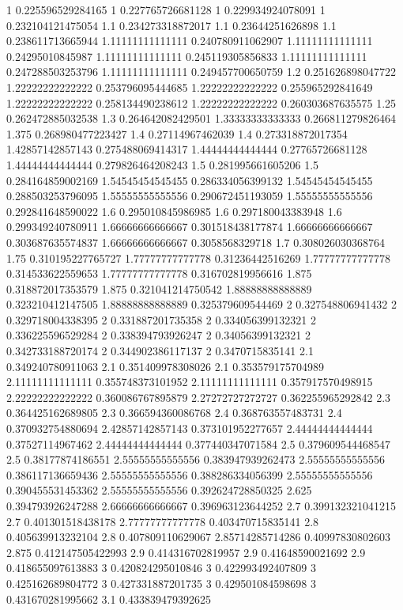 {1 0.225596529284165
1 0.227765726681128
1 0.229934924078091
1 0.232104121475054
1.1 0.234273318872017
1.1 0.23644251626898
1.1 0.238611713665944
1.11111111111111 0.240780911062907
1.11111111111111 0.24295010845987
1.11111111111111 0.245119305856833
1.11111111111111 0.247288503253796
1.11111111111111 0.249457700650759
1.2 0.251626898047722
1.22222222222222 0.253796095444685
1.22222222222222 0.255965292841649
1.22222222222222 0.258134490238612
1.22222222222222 0.260303687635575
1.25 0.262472885032538
1.3 0.264642082429501
1.33333333333333 0.266811279826464
1.375 0.268980477223427
1.4 0.27114967462039
1.4 0.273318872017354
1.42857142857143 0.275488069414317
1.44444444444444 0.27765726681128
1.44444444444444 0.279826464208243
1.5 0.281995661605206
1.5 0.284164859002169
1.54545454545455 0.286334056399132
1.54545454545455 0.288503253796095
1.55555555555556 0.290672451193059
1.55555555555556 0.292841648590022
1.6 0.295010845986985
1.6 0.297180043383948
1.6 0.299349240780911
1.66666666666667 0.301518438177874
1.66666666666667 0.303687635574837
1.66666666666667 0.3058568329718
1.7 0.308026030368764
1.75 0.310195227765727
1.77777777777778 0.31236442516269
1.77777777777778 0.314533622559653
1.77777777777778 0.316702819956616
1.875 0.318872017353579
1.875 0.321041214750542
1.88888888888889 0.323210412147505
1.88888888888889 0.325379609544469
2 0.327548806941432
2 0.329718004338395
2 0.331887201735358
2 0.334056399132321
2 0.336225596529284
2 0.338394793926247
2 0.34056399132321
2 0.342733188720174
2 0.344902386117137
2 0.3470715835141
2.1 0.349240780911063
2.1 0.351409978308026
2.1 0.353579175704989
2.11111111111111 0.355748373101952
2.11111111111111 0.357917570498915
2.22222222222222 0.360086767895879
2.27272727272727 0.362255965292842
2.3 0.364425162689805
2.3 0.366594360086768
2.4 0.368763557483731
2.4 0.370932754880694
2.42857142857143 0.373101952277657
2.44444444444444 0.37527114967462
2.44444444444444 0.377440347071584
2.5 0.379609544468547
2.5 0.38177874186551
2.55555555555556 0.383947939262473
2.55555555555556 0.386117136659436
2.55555555555556 0.388286334056399
2.55555555555556 0.390455531453362
2.55555555555556 0.392624728850325
2.625 0.394793926247288
2.66666666666667 0.396963123644252
2.7 0.399132321041215
2.7 0.401301518438178
2.77777777777778 0.403470715835141
2.8 0.405639913232104
2.8 0.407809110629067
2.85714285714286 0.40997830802603
2.875 0.412147505422993
2.9 0.414316702819957
2.9 0.41648590021692
2.9 0.418655097613883
3 0.420824295010846
3 0.422993492407809
3 0.425162689804772
3 0.427331887201735
3 0.429501084598698
3 0.431670281995662
3.1 0.433839479392625
}
